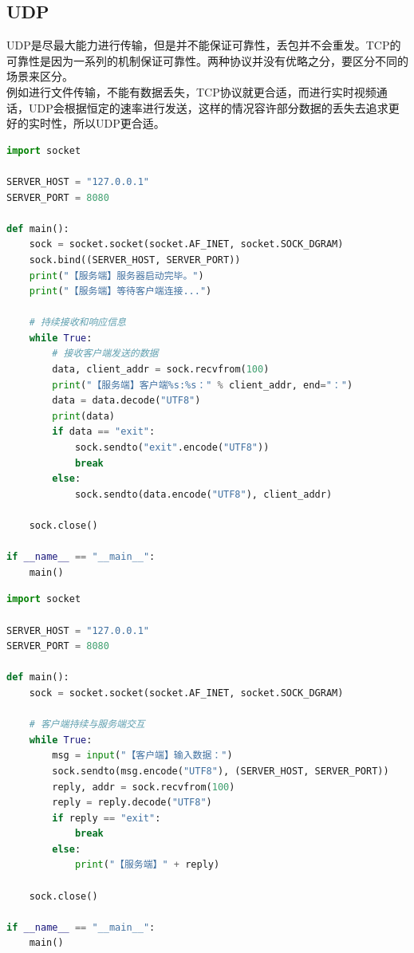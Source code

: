 \vspace{0.5cm}

\subsection{UDP}

UDP是尽最大能力进行传输，但是并不能保证可靠性，丢包并不会重发。TCP的可靠性是因为一系列的机制保证可靠性。两种协议并没有优略之分，要区分不同的场景来区分。\\

例如进行文件传输，不能有数据丢失，TCP协议就更合适，而进行实时视频通话，UDP会根据恒定的速率进行发送，这样的情况容许部分数据的丢失去追求更好的实时性，所以UDP更合适。\\


\begin{lstlisting}[language=Python, title=udp\_server.py]
import socket

SERVER_HOST = "127.0.0.1"
SERVER_PORT = 8080

def main():
    sock = socket.socket(socket.AF_INET, socket.SOCK_DGRAM)
    sock.bind((SERVER_HOST, SERVER_PORT))
    print("【服务端】服务器启动完毕。")
    print("【服务端】等待客户端连接...")

    # 持续接收和响应信息
    while True:
        # 接收客户端发送的数据
        data, client_addr = sock.recvfrom(100)
        print("【服务端】客户端%s:%s：" % client_addr, end="：")
        data = data.decode("UTF8")
        print(data)
        if data == "exit":
            sock.sendto("exit".encode("UTF8"))
            break
        else:
            sock.sendto(data.encode("UTF8"), client_addr)
    
    sock.close()

if __name__ == "__main__":
    main()
\end{lstlisting}

\begin{lstlisting}[language=Python, title=udp\_client.py]
import socket

SERVER_HOST = "127.0.0.1"
SERVER_PORT = 8080

def main():
    sock = socket.socket(socket.AF_INET, socket.SOCK_DGRAM)

    # 客户端持续与服务端交互
    while True:     
        msg = input("【客户端】输入数据：")
        sock.sendto(msg.encode("UTF8"), (SERVER_HOST, SERVER_PORT))
        reply, addr = sock.recvfrom(100)
        reply = reply.decode("UTF8")
        if reply == "exit":
            break
        else:
            print("【服务端】" + reply)

    sock.close()

if __name__ == "__main__":
    main()    
\end{lstlisting}

\newpage